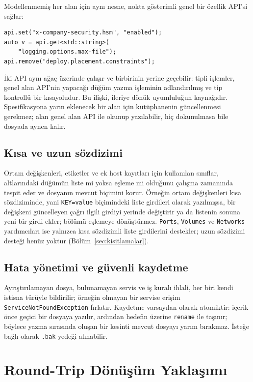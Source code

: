 \documentclass[conference]{IEEEtran}
\begin{document}
Modellenmemiş her alan için aynı nesne, nokta gösterimli genel bir özellik
API'si sağlar:

{\footnotesize
\begin{verbatim}
api.set("x-company-security.hsm", "enabled");
auto v = api.get<std::string>(
    "logging.options.max-file");
api.remove("deploy.placement.constraints");
\end{verbatim}
}

İki API aynı ağaç üzerinde çalışır ve birbirinin yerine geçebilir: tipli
işlemler, genel alan API'nin yapacağı düğüm yazma işleminin adlandırılmış ve
tip kontrollü bir kısayoludur. Bu ilişki, ileriye dönük uyumluluğun
kaynağıdır. Spesifikasyona yarın eklenecek bir alan için kütüphanenin
güncellenmesi gerekmez; alan genel alan API ile okunup yazılabilir, hiç
dokunulmasa bile dosyada aynen kalır.

\subsection{Kısa ve uzun sözdizimi}
Ortam değişkenleri, etiketler ve ek host kayıtları için kullanılan
sınıflar, altlarındaki düğümün liste mi yoksa eşleme mi olduğunu çalışma
zamanında tespit eder ve dosyanın mevcut biçimini korur. Örneğin ortam
değişkenleri kısa sözdiziminde, yani \texttt{KEY=value} biçimindeki liste
girdileri olarak yazılmışsa, bir değişkeni güncelleyen çağrı ilgili
girdiyi yerinde değiştirir ya da listenin sonuna yeni bir girdi ekler;
bölümü eşlemeye dönüştürmez. \texttt{Ports}, \texttt{Volumes} ve \texttt{Networks}
yardımcıları ise yalnızca kısa sözdizimli liste girdilerini destekler;
uzun sözdizimi desteği henüz yoktur (Bölüm~\ref{sec:kisitlamalar}).

\subsection{Hata yönetimi ve güvenli kaydetme}
Ayrıştırılamayan dosya, bulunamayan servis ve iş kuralı ihlali, her biri
kendi istisna türüyle bildirilir; örneğin olmayan bir servise erişim
\texttt{ServiceNotFoundException} fırlatır.
Kaydetme varsayılan olarak atomiktir: içerik önce geçici bir dosyaya
yazılır, ardından hedefin üzerine \texttt{rename} ile taşınır; böylece
yazma sırasında oluşan bir kesinti mevcut dosyayı yarım bırakmaz.
İsteğe bağlı olarak \texttt{.bak} yedeği alınabilir.

\section{Round-Trip Dönüşüm Yaklaşımı}
\label{sec:yaklasim}
\end{document}
